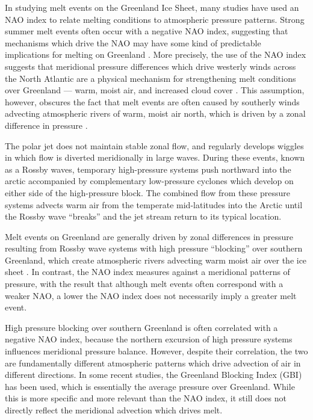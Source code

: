 \documentclass[11pt]{report}
\begin{document}
In studying melt events on the Greenland Ice Sheet, many studies have used an NAO index to relate melting conditions to atmospheric pressure patterns. Strong summer melt events often occur with a negative NAO index, suggesting that mechanisms which drive the NAO may have some kind of predictable implications for melting on Greenland \cite[][]{hanna2013,mattingly2018,mcmillan2016,bevis2019,getraerFall,hahn2018}. More precisely, the use of the NAO index suggests that meridional pressure differences which drive westerly winds across the North Atlantic are a physical mechanism for strengthening melt conditions over Greenland --- warm, moist air, and increased cloud cover \cite[][]{hanna2013,mattingly2018,mcmillan2016,bevis2019,getraerFall,hahn2018}. This assumption, however, obscures the fact that melt events are often caused by southerly winds advecting atmospheric rivers of warm, moist air north, which is driven by a zonal difference in pressure \cite[][]{hanna2013,mattingly2018}.

The polar jet does not maintain stable zonal flow, and regularly develops wiggles in which flow is diverted meridionally in large waves. During these events, known as a Rossby waves, temporary high-pressure systems push northward into the arctic accompanied by complementary low-pressure cyclones which develop on either side of the high-pressure block. The combined flow from these pressure systems advects warm air from the temperate mid-latitudes into the Arctic until the Rossby wave ``breaks'' and the jet stream return to its typical location.

Melt events on Greenland are generally driven by zonal differences in pressure resulting from Rossby wave systems with high pressure ``blocking'' over southern Greenland, which create atmospheric rivers advecting warm moist air over the ice sheet \cite[][]{mattingly2018}. In contrast, the NAO index measures against a meridional patterns of pressure, with the result that although melt events often correspond with a weaker NAO, a lower the NAO index does not necessarily imply a greater melt event.

High pressure blocking over southern Greenland is often correlated with a negative NAO index, because the northern excursion of high pressure systems influences meridional pressure balance. However, despite their correlation, the two are fundamentally different atmospheric patterns which drive advection of air in different directions. In some recent studies, the Greenland Blocking Index (GBI) has been used, which is essentially the average pressure over Greenland. While this is more specific and more relevant than the NAO index, it still does not directly reflect the meridional advection which drives melt.
\end{document}
